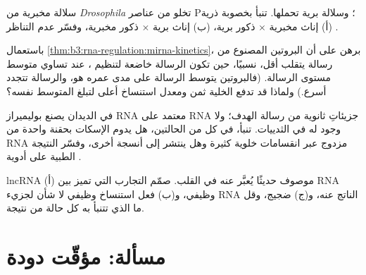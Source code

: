 \begin{exercise}[$\star\star$]\label{exo:b3:rna-regulation:9}
سلالة مخبرية من \emph{Drosophila} تخلو من عناصر P؛ وسلالة برية
تحملها. تنبأ بخصوبة ذرية (أ) إناث مخبرية $\times$ ذكور برية،
(ب) إناث برية $\times$ ذكور مخبرية، وفسّر عدم التناظر .
\end{exercise}

\begin{exercise}[$\star\star\star$]\label{exo:b3:rna-regulation:10}
باستعمال \cref{thm:b3:rna-regulation:mirna-kinetics}، برهن على أن
البروتين المصنوع من رسالة يتقلب أقل، نسبيًا، حين تكون الرسالة خاضعة
لتنظيم ، عند تساوي متوسط مستوى الرسالة. (فالبروتين يتوسط الرسالة
على مدى عمره هو، والرسالة تتجدد أسرع.) ولماذا قد تدفع الخلية ثمن
 ومعدل استنساخ أعلى لتبلغ المتوسط نفسه؟
\end{exercise}

\begin{exercise}[$\star\star\star$]\label{exo:b3:rna-regulation:11}
في الديدان يصنع بوليميراز RNA معتمد على RNA جزيئاتِ  ثانوية من
رسالة الهدف؛ ولا وجود له في الثدييات. تنبأ، في كل من الحالتين، هل
يدوم الإسكات بحقنة واحدة من RNA مزدوج عبر انقسامات خلوية كثيرة وهل
ينتشر إلى أنسجة أخرى، وفسّر النتيجة الطبية على أدوية .
\end{exercise}

\begin{exercise}[$\star\star\star$]\label{exo:b3:rna-regulation:12}
lncRNA موصوف حديثًا يُعبَّر عنه في القلب. صمّم التجارب التي تميز بين
(أ) RNA وظيفي، و(ب) فعل استنساخ وظيفي لا شأن لجزيء RNA الناتج عنه،
و(ج) ضجيج، وقل ما الذي تتنبأ به كل حالة من نتيجة.
\end{exercise}

\section{مسألة: مؤقّت دودة}


